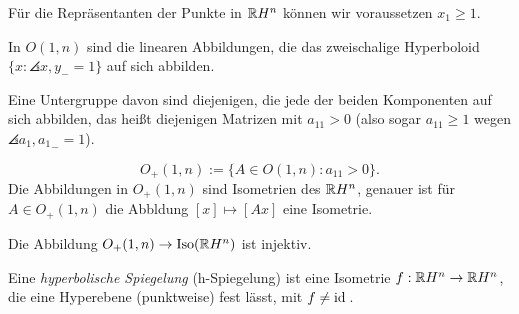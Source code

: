 Für die Repräsentanten der Punkte in $\mathbb{R} H^n$ können wir voraussetzen $x_1
\ge 1.$

In $O(1,n)$ sind die linearen Abbildungen, die das zweischalige Hyperboloid $\{
x : \angles{x,y}_- = 1 \}$ auf sich abbilden.

Eine Untergruppe davon sind diejenigen, die jede der beiden Komponenten auf sich
abbilden, das heißt diejenigen Matrizen mit $a_{11} > 0$ (also sogar $a_{11} \ge
1$ wegen $\angles{a_1,a_1}_- = 1$).

\begin{defn*}
  \[ O_+(1,n) := \{ A \in O(1,n) : a_{11} > 0 \}. \]
  Die Abbildungen in $O_+(1,n)$ sind Isometrien des $\mathbb{R} H^n$, genauer ist für
  $A \in O_+(1,n)$ die Abbldung $[x] \mapsto [Ax]$ eine Isometrie.

  Die Abbildung $O_+(1,n) \to \operatorname{Iso}( \mathbb{R} H^n )$ ist injektiv.
\end{defn*}

\begin{defn*}
  Eine \emph{hyperbolische Spiegelung} (h-Spiegelung) ist eine Isometrie $f:
  \mathbb{R} H^n \to \mathbb{R} H^n$, die eine Hyperebene (punktweise) fest lässt, mit $f
  \ne \mathrm{id}\,$.
\end{defn*}

